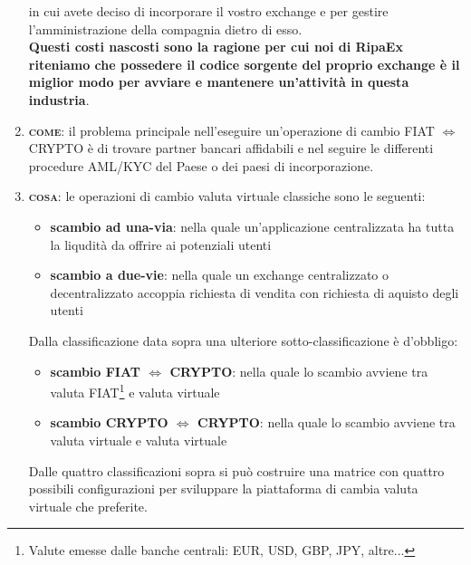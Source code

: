 \begin{enumerate}
	in cui avete deciso di incorporare il vostro exchange e per gestire l'amministrazione della compagnia dietro di esso.\\
	\textbf{Questi costi nascosti sono la ragione per cui noi di RipaEx riteniamo che possedere il codice sorgente del proprio exchange è il miglior
	modo per avviare e mantenere un'attività in questa industria}.
	\item \textbf{\textsc{come}}: il problema principale nell'eseguire un'operazione di cambio FIAT $\Leftrightarrow$ CRYPTO è di trovare partner bancari affidabili
	e nel seguire le differenti procedure AML/KYC del Paese o dei paesi di incorporazione.
	\item \textbf{\textsc{cosa}}: le operazioni di cambio valuta virtuale classiche sono le seguenti:
		\begin{itemize}
			\item \textbf{scambio ad una-via}: nella quale un'applicazione centralizzata ha tutta la liqudità da offrire ai potenziali utenti
			\item \textbf{scambio a due-vie}: nella quale un exchange centralizzato o decentralizzato accoppia richiesta di vendita con richiesta di aquisto degli utenti
		\end{itemize}
		Dalla classificazione data sopra una ulteriore sotto-classificazione è d'obbligo:
		\begin{itemize}
			\item \textbf{scambio FIAT $\Leftrightarrow$ CRYPTO}: nella quale lo scambio avviene tra valuta FIAT\footnote{Valute emesse dalle banche centrali: EUR, USD, GBP, JPY, altre...}
			e valuta virtuale
			\item \textbf{scambio CRYPTO $\Leftrightarrow$ CRYPTO}: nella quale lo scambio avviene tra valuta virtuale e valuta virtuale
		\end{itemize}
	Dalle quattro classificazioni sopra si può costruire una matrice con quattro possibili configurazioni per sviluppare la piattaforma di cambia valuta virtuale
	che preferite.
	\begin{tcbraster}[raster columns=3,raster rows=1,raster height=0.8cm,
		valign=center, halign=center,
		enhanced,size=small,sharp corners,colframe=azure(colorwheel),coltext=white,
		colback=azure(colorwheel),fit algorithm=hybrid* ]
		\tcboxfit{}
	\end{tcbraster}
	\begin{tcbraster}[raster columns=3,raster rows=2,raster height=5cm,
		valign=center, halign=center,
		enhanced,size=small,sharp corners,colframe=silver,coltext=black,
		colback=silver,fit algorithm=hybrid* ]
	

\end{tcbraster}
\end{enumerate}
